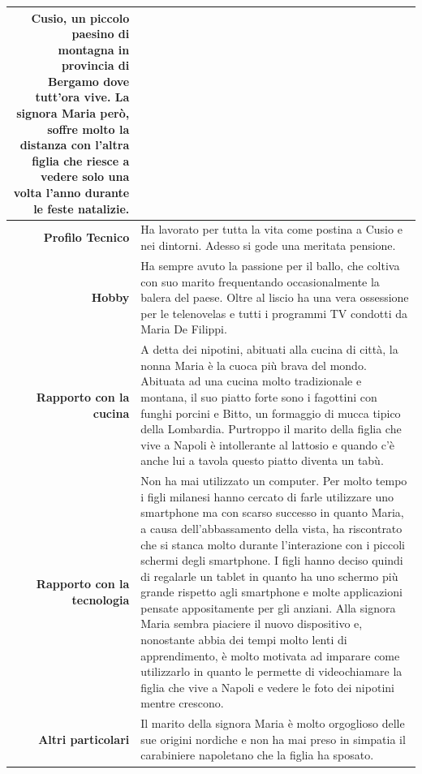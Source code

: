 \begin{table}[H]
\begin{centering}
\begin{tabular} { | r  p{12cm} | }
Cusio, un piccolo paesino di montagna in provincia di Bergamo dove
tutt'ora vive. La signora Maria però, soffre molto la distanza con
l'altra figlia che riesce a vedere solo una volta l'anno durante le
feste natalizie. \\ \hline
		\textbf{Profilo Tecnico} & Ha lavorato per tutta la vita come
postina a Cusio e nei dintorni. Adesso si gode una meritata pensione. \\ \hline
		\textbf{Hobby} & Ha sempre avuto la passione per il ballo, che
coltiva con suo marito frequentando occasionalmente la balera del paese.
Oltre al liscio ha una vera ossessione per le telenovelas e tutti i
programmi TV condotti da Maria De Filippi.  \\\hline
		\textbf{Rapporto con la cucina} & A detta dei nipotini, abituati
alla cucina di città, la nonna Maria è la cuoca
più brava del mondo. Abituata ad una cucina molto tradizionale e
montana, il suo piatto forte sono i fagottini con funghi porcini e
Bitto, un formaggio di mucca tipico della Lombardia. Purtroppo il
marito della figlia che vive a Napoli è intollerante al lattosio e
quando c'è anche lui a tavola questo piatto diventa un tabù.\\ \hline
		\textbf{Rapporto con la tecnologia} & Non ha mai utilizzato un
computer. Per molto tempo i figli milanesi hanno cercato di farle
utilizzare uno
smartphone ma con scarso successo in quanto Maria, a causa
dell'abbassamento della vista, ha riscontrato che si stanca molto
	durante l'interazione con i piccoli schermi degli smartphone. I
figli hanno deciso quindi di regalarle un tablet in quanto ha uno schermo più
grande rispetto agli smartphone e molte applicazioni pensate appositamente per gli anziani.
Alla signora Maria sembra piaciere il nuovo dispositivo e, nonostante abbia dei 
tempi molto lenti di apprendimento, è molto motivata ad
imparare come utilizzarlo in quanto le permette di
videochiamare la figlia che vive a Napoli e vedere le foto dei nipotini
mentre crescono. \\ \hline
		\textbf{Altri particolari} & Il marito della signora Maria è
molto orgoglioso delle sue origini nordiche e non ha mai preso in
simpatia il carabiniere napoletano che la figlia ha sposato. \\\hline

	\end{tabular}
	\end{centering}
\end{table}

